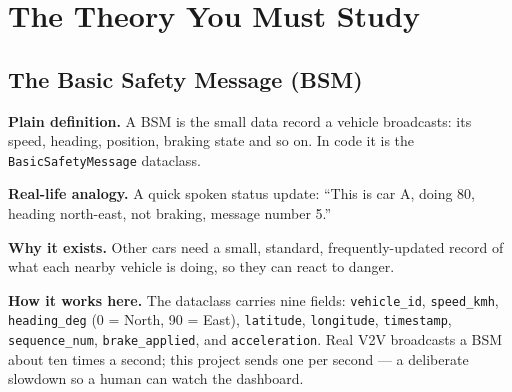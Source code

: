 \documentclass[11pt,a4paper]{report}
\begin{document}
\begin{center}
\end{center}

\section{The Theory You Must Study}

\subsection{The Basic Safety Message (BSM)}
\textbf{Plain definition.} A BSM is the small data record a vehicle broadcasts:
its speed, heading, position, braking state and so on. In code it is the
\texttt{BasicSafetyMessage} dataclass.

\textbf{Real-life analogy.} A quick spoken status update: ``This is car A, doing
80, heading north-east, not braking, message number 5.''

\textbf{Why it exists.} Other cars need a small, standard, frequently-updated
record of what each nearby vehicle is doing, so they can react to danger.

\textbf{How it works here.} The dataclass carries nine fields:
\texttt{vehicle\_id}, \texttt{speed\_kmh}, \texttt{heading\_deg} (0 = North,
90 = East), \texttt{latitude}, \texttt{longitude}, \texttt{timestamp},
\texttt{sequence\_num}, \texttt{brake\_applied}, and \texttt{acceleration}.
Real V2V broadcasts a BSM about ten times a second; this project sends one per
second --- a deliberate slowdown so a human can watch the dashboard.
\end{document}
